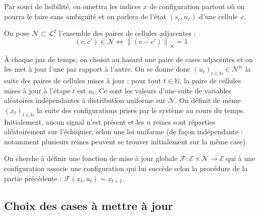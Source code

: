 \documentclass[11pt, openany]{article}
\newcommand{\N}{\mathbb{N}}
\newcommand{\norm}[1]{\left\lVert#1\right\rVert}
\newcommand{\La}{\mathcal{L}}
\newcommand{\Ne}{\mathcal{N}}
\newcommand{\E}{\mathcal{E}}
\begin{document}
Par souci de lisibilité, on omettra les indices $x$ de configuration partout où on pourra le faire sans ambiguïté et on parlera de l'état $(s_c, n_c)$ d'une cellule~$c$.

On pose $\Ne \subset \La^2$ l'ensemble des paires de cellules adjacentes : $$(c, c') \in \Ne \iff \norm{(c-c')}_\infty = 1$$

À chaque pas de temps, on choisit au hasard une paire de cases adjacentes et on les met à jour l'une par rapport à l'autre.
On se donne donc $(u_t)_{t\in\N} \in \Ne^\N$ la suite des paires de cellules mises à jour : pour tout $t\in\N$, la paire de cellules mises à jour à l'étape $t$ est $u_t$. Ce sont les valeurs d'une suite de variables aléatoires indépendantes à distribution uniforme sur $\Ne$. On définit de même $(x_t)_{t\in\N}$ la suite des configurations prises par le système au cours du temps. Initialement, aucun signal n'est présent et les $n$ reines sont réparties aléatoirement sur l'échiquier, selon une loi uniforme (de façon indépendante : notamment plusieurs reines peuvent se trouver initialement sur la même case). 

On cherche à définir une fonction de mise à jour globale $\mathcal{F} : {\E\times\Ne}\to\E$ qui à une configuration associe une configuration qui lui succède selon la procédure de la partie précédente : $\mathcal{F}(x_t, u_t) = x_{t+1}$.

 
\subsection*{Choix des cases à mettre à jour}
\end{document}
